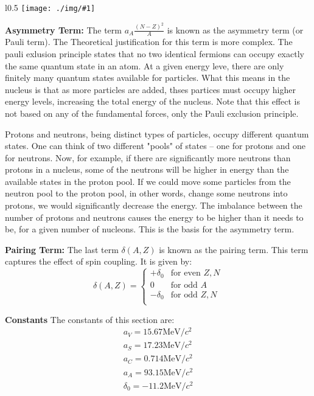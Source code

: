 \documentclass[10pt,a4paper]{article}
\newcounter{figurecounter}
\newcommand{\imgl}[3]{
    \begin{wrapfigure}{l}{#2\textwidth}
        \centering
        \captionsetup{justification=centering,margin=0.5cm,labelformat=empty}
        \texttt{[image: ./img/\#1]}
        \label{figure}
        \caption{\small \textbf{fig: \thefigurecounter} -- \textcolor{darkliver}{#3}}
    \end{wrapfigure}
    \addtocounter{figurecounter}{1}}
\newcommand{\mev}{\text{MeV}}
\begin{document}
\imgl{asymmetry}{0.5}{Asymmetry Term}
\textbf{Asymmetry Term:} The term $a_A\frac{(N-Z)^2}{A}$ is known as the asymmetry term (or Pauli term). The Theoretical justification for this term is more complex. The pauli exlusion principle states that no two identical fermions can occupy exactly the same quantum state in an atom. At a given energy leve, there are only finitely many quantum states available for particles. What this means in the nucleus is that as more particles are added, thses partices must occupy higher energy levels, increasing the total energy of the nucleus. Note that this effect is not based on any of the fundamental forces, only the Pauli exclusion principle. 

Protons and neutrons, being distinct types of particles, occupy different quantum states. One can think of two different "pools" of states – one for protons and one for neutrons. Now, for example, if there are significantly more neutrons than protons in a nucleus, some of the neutrons will be higher in energy than the available states in the proton pool. If we could move some particles from the neutron pool to the proton pool, in other words, change some neutrons into protons, we would significantly decrease the energy. The imbalance between the number of protons and neutrons causes the energy to be higher than it needs to be, for a given number of nucleons. This is the basis for the asymmetry term.


\textbf{Pairing Term:} The last term $\delta(A,Z)$ is known as the pairing term. This term captures the effect of spin coupling. It is given by:
\begin{equation}
    \delta(A,Z) =\left\{ 
    \begin{array}{ll}
        +\delta_0 & \text{for even } Z, N\\
        0 & \text{for odd } A\\
        -\delta_0 & \text{for odd } Z, N\\
    \end{array}\right.
\end{equation}

\textbf{Constants}
The constants of this section are:
\begin{align*}
    a_V = 15.67\mev/c^2\\
    a_S = 17.23\mev/c^2\\
    a_C = 0.714\mev/c^2\\
    a_A = 93.15\mev/c^2\\
    \delta_0 = -11.2\mev/c^2
\end{align*}
\end{document}
